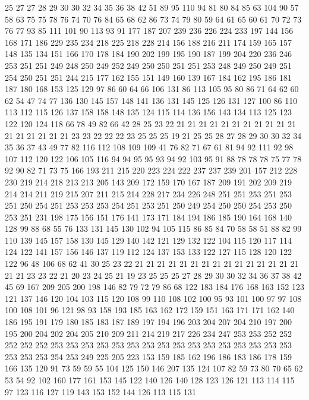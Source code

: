 25 27 27 28 29 30 30 32 34 35 36 38 42 51 89 95 110 94 81 80
84 85 63 104 90 57 58 63 75 75 78 76 74 70 76 84 65 68 62 86
73 74 79 80 59 64 61 65 60 61 70 72 73 76 77 93 85 111 101 90
113 93 91 177 187 207 239 236 226 224 233 197 144 156 168 171 186 229 235 234
218 225 218 228 214 156 188 216 211 174 159 165 157 148 135 134 151 166 170 178
184 190 202 199 195 190 187 199 204 220 236 246 253 251 251 249 248 250 249 252
249 250 250 251 251 253 248 249 250 249 251 254 250 251 251 244 215 177 162 155
151 149 160 139 167 184 162 195 186 181 187 180 168 153 125 129 97 86 60 64
66 106 131 86 113 105 95 80 86 71 64 62 60 62 54 47 74 77 136 130
145 157 148 141 136 131 145 125 126 131 127 100 86 110 113 112 115 126 137 158
158 148 135 124 115 114 136 156 143 134 113 125 123 122 120 124 118 66 78 49
82 66 42 28 25 23 22 21 21 21 21 21 21 21 21 21 21 21 21 21
21 21 21 21 23 23 22 22 22 23 25 25 25 19 21 25 25 28 27 28
29 30 30 32 34 35 36 37 43 49 77 82 116 112 108 109 109 41 76 82
71 67 61 81 94 92 111 92 98 107 112 120 122 106 105 116 94 94 95 95
93 94 92 103 95 91 88 78 78 78 75 77 78 92 90 82 71 73 75 166
193 211 215 220 223 224 222 237 237 239 201 157 212 228 230 219 214 218 213 213
205 143 209 172 159 170 167 187 209 191 202 209 219 214 214 211 219 215 207 211
215 214 228 217 234 226 248 251 251 253 251 253 251 250 254 251 253 253 253 254
251 253 251 250 249 254 250 250 254 253 250 253 251 231 198 175 156 151 176 141
173 171 184 194 186 185 190 164 168 140 128 99 88 68 55 76 133 131 145 130
102 94 105 115 86 85 84 70 58 58 51 88 82 99 110 139 145 157 158 130
145 129 140 142 121 129 132 122 104 115 120 117 114 124 122 141 157 156 146 137
119 112 124 137 153 133 122 127 115 128 120 122 122 96 48 106 68 62 41 30
25 23 22 21 21 21 21 21 21 21 21 21 21 21 21 21 21 21 21 21
23 23 22 21 20 23 24 25 21 19 23 25 25 25 27 28 29 30 30 32
34 36 37 38 42 45 69 167 209 205 200 198 146 82 79 72 79 86 68 122
183 184 176 168 163 152 123 121 137 146 120 104 103 115 120 108 99 110 108 102
100 95 93 101 100 97 97 108 100 108 101 96 121 98 93 158 193 185 163 162
172 159 151 163 171 171 162 140 186 195 191 179 180 185 183 187 189 197 194 196
203 204 207 204 210 197 200 195 200 204 202 204 205 210 209 211 214 219 217 226
234 247 253 253 252 252 252 252 252 253 253 253 253 253 253 253 253 253 253 253
253 253 253 253 253 253 253 253 254 253 249 225 205 223 153 159 185 162 196 186
183 186 178 159 166 135 120 91 73 59 59 55 104 125 150 146 207 135 124 107
82 59 73 80 70 65 62 53 54 92 102 160 177 161 153 145 122 140 126 140
128 123 126 121 113 114 115 97 123 116 127 119 143 153 152 144 126 113 115 131
